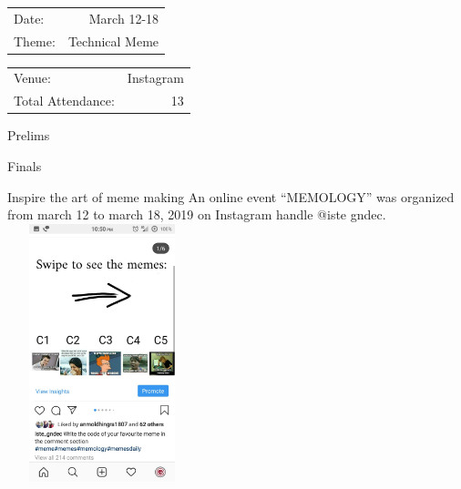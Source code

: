 \documentclass[12pt, a4 paper]{article}
\begin{document}
\begin{center}
\begin{multicols}{2}
\begin{tabular}{l r}
Date: & March 12-18\\ %
Theme: & Technical Meme \\ %
\end{tabular}
\columnbreak
\begin{tabular}{l r}
Venue: & Instagram \\ %
Total Attendance: & 13 \\ %
\end{tabular}
\end{multicols}


\begin{Large}
\begin{multicols}{2}

Prelims 
\columnbreak

Finals
\end{multicols}
\end{Large}


\begin{Large}
\begin{multicols}{2}
 Inspire the art of meme making
An online event “MEMOLOGY” was organized from march 12 to march 18, 2019 on Instagram handle @iste \textunderscore gndec. 
\columnbreak
\includegraphics[width=5.5cm, height=7.5cm]{image1.jpeg}
\end{multicols}

\newpage


\end{Large}
\end{center}
\end{document}
